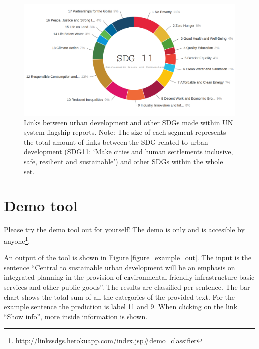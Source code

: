 \documentclass[]{article}
\begin{document}
\begin{figure}[H]	
	\centering
	\includegraphics[width=1\textwidth]{Links_between_urban_development_and_other_SDGs_made_within_UN_system_flagship_reports.png}
	\caption{Links between urban development and other SDGs made within UN system flagship reports. Note: The size of each segment represents the total amount of links between the SDG related to urban development (SDG11: ‘Make cities and human settlements inclusive, safe, resilient and sustainable’) and other SDGs within the whole set.}
\end{figure}



\section{Demo tool}
Please try the demo tool out for yourself! The demo is only and is accesible by anyone\footnote{\url{http://linkssdgs.herokuapp.com/index.jsp\#demo_classifier}}. 

An output of the tool is shown in Figure \ref{figure_example_out}. The input is the sentence ``Central to sustainable urban development will be an emphasis on integrated planning in the provision of environmental friendly infrastructure basic services and other public goods''. The results are classified per sentence. The bar chart shows the total sum of all the categories of the provided text. For the example sentence the prediction is label 11 and 9. When clicking on the link ``Show info'', more inside information is shown.
\end{document}
